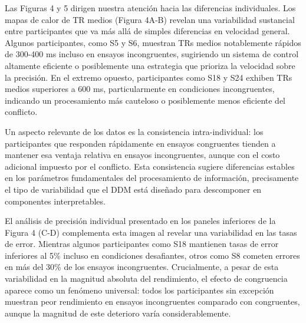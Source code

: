 \documentclass[
  spanish,
  10pt,
]{article}
\begin{document}
Las Figuras 4 y 5 dirigen nuestra atención hacia las diferencias
individuales. Los mapas de calor de TR medios (Figura 4A-B) revelan una
variabilidad sustancial entre participantes que va más allá de simples
diferencias en velocidad general. Algunos participantes, como S5 y S6,
muestran TRs medios notablemente rápidos de 300-400 ms incluso en
ensayos incongruentes, sugiriendo un sistema de control altamente
eficiente o posiblemente una estrategia que prioriza la velocidad sobre
la precisión. En el extremo opuesto, participantes como S18 y S24
exhiben TRs medios superiores a 600 ms, particularmente en condiciones
incongruentes, indicando un procesamiento más cauteloso o posiblemente
menos eficiente del conflicto.

Un aspecto relevante de los datos es la consistencia intra-individual:
los participantes que responden rápidamente en ensayos congruentes
tienden a mantener esa ventaja relativa en ensayos incongruentes, aunque
con el costo adicional impuesto por el conflicto. Esta consistencia
sugiere diferencias estables en los parámetros fundamentales del
procesamiento de información, precisamente el tipo de variabilidad que
el DDM está diseñado para descomponer en componentes interpretables.

El análisis de precisión individual presentado en los paneles inferiores
de la Figura 4 (C-D) complementa esta imagen al revelar una variabilidad
en las tasas de error. Mientras algunos participantes como S18 mantienen
tasas de error inferiores al 5\% incluso en condiciones desafiantes,
otros como S8 cometen errores en más del 30\% de los ensayos
incongruentes. Crucialmente, a pesar de esta variabilidad en la magnitud
absoluta del rendimiento, el efecto de congruencia aparece como un
fenómeno universal: todos los participantes sin excepción muestran peor
rendimiento en ensayos incongruentes comparado con congruentes, aunque
la magnitud de este deterioro varía considerablemente.
\end{document}
